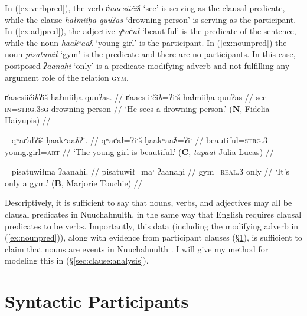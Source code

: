 In (\ref{ex:verbpred}), the verb \textit{n̓aacsiičiƛ} `see' is serving as the clausal predicate, while the clause \textit{hałmiiḥa quuʔas} `drowning person' is serving as the participant. In (\ref{ex:adjpred}), the adjective \textit{qʷac̓ał} `beautiful' is the predicate of the sentence, while the noun \textit{ḥaakʷaaƛ} `young girl' is the participant. In (\ref{ex:nounpred}) the noun \textit{pisatuwił} `gym' is the predicate and there are no participants. In this case, postposed \textit{ʔaanaḥi} `only' is a predicate-modifying adverb and not fulfilling any argument role of the relation \textsc{gym}.

\begin{comment}
While all three words have semantic relations (\textsc{see}, \textsc{drown}, \textsc{person}), only one is the syntactic predicate of the sentence.	
\end{comment}

\ex \label{ex:verbpred}
\begingl
\glpreamble n̓aacsiičiƛʔiš hałmiiḥa quuʔas. //
\gla n̓aacs-iˑčiƛ=ʔiˑš hałmiiḥa quuʔas //
\glb see-\textsc{in}=\textsc{strg.3sg} drowning person //
\glft `He sees a drowning person.' (\textbf{N}, Fidelia Haiyupis) //
\endgl
\xe

\ex~ \label{ex:adjpred}
\begingl
\glpreamble qʷac̓ałʔiš ḥaakʷaaƛʔi. //
\gla qʷac̓ał=ʔiˑš ḥaakʷaaƛ=ʔiˑ //
\glb beautiful=\textsc{strg.3} young.girl=\textsc{art} //
\glft `The young girl is beautiful.' (\textbf{C}, \textit{tupaat} Julia Lucas) //
\endgl
\xe

\ex~ \label{ex:nounpred}
\begingl
\glpreamble pisatuwiłma ʔaanaḥi. //
\gla pisatuwił=maˑ ʔaanaḥi //
\glb gym=\textsc{real.3} only //
\glft `It's only a gym.' (\textbf{B}, Marjorie Touchie) //
\endgl
\xe

Descriptively, it is sufficient to say that nouns, verbs, and adjectives may all be clausal predicates in Nuuchahnulth, in the same way that English requires clausal predicates to be verbs. Importantly, this data (including the modifying adverb in (\ref{ex:nounpred})), along with evidence from participant clauses (\S\ref{sec:clause:partp}), is sufficient to claim that nouns are events in Nuuchahnulth \citep{inman2018}. I will give my method for modeling this in (\S\ref{sec:clause:analysis}).

\section{Syntactic Participants} \label{sec:clause:partp}

